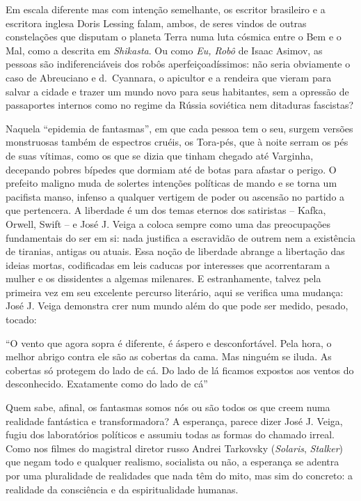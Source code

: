 \documentclass[
  letterpaper,
  DIV=11,
  numbers=noendperiod]{scrartcl}
\begin{document}
Em escala diferente mas com intenção semelhante, os escritor brasileiro
e a escritora inglesa Doris Lessing falam, ambos, de seres vindos de
outras constelações que disputam o planeta Terra numa luta cósmica entre
o Bem e o Mal, como a descrita em \emph{Shikasta}. Ou como \emph{Eu,
Robô} de Isaac Asimov, as pessoas são indiferenciáveis dos robôs
aperfeiçoadíssimos: não seria obviamente o caso de Abreuciano e
d.~Cyannara, o apicultor e a rendeira que vieram para salvar a cidade e
trazer um mundo novo para seus habitantes, sem a opressão de passaportes
internos como no regime da Rússia soviética nem ditaduras fascistas?

Naquela ``epidemia de fantasmas'', em que cada pessoa tem o seu, surgem
versões monstruosas também de espectros cruéis, os Tora-pés, que à noite
serram os pés de suas vítimas, como os que se dizia que tinham chegado
até Varginha, decepando pobres bípedes que dormiam até de botas para
afastar o perigo. O prefeito maligno muda de solertes intenções
políticas de mando e se torna um pacifista manso, infenso a qualquer
vertigem de poder ou ascensão no partido a que pertencera. A liberdade é
um dos temas eternos dos satiristas -- Kafka, Orwell, Swift -- e José J.
Veiga a coloca sempre como uma das preocupações fundamentais do ser em
si: nada justifica a escravidão de outrem nem a existência de tiranias,
antigas ou atuais. Essa noção de liberdade abrange a libertação das
ideias mortas, codificadas em leis caducas por interesses que
acorrentaram a mulher e os dissidentes a algemas milenares. E
estranhamente, talvez pela primeira vez em seu excelente percurso
literário, aqui se verifica uma mudança: José J. Veiga demonstra crer
num mundo além do que pode ser medido, pesado, tocado:

``O vento que agora sopra é diferente, é áspero e desconfortável. Pela
hora, o melhor abrigo contra ele são as cobertas da cama. Mas ninguém se
iluda. As cobertas só protegem do lado de cá. Do lado de lá ficamos
expostos aos ventos do desconhecido. Exatamente como do lado de cá''

Quem sabe, afinal, os fantasmas somos nós ou são todos os que creem numa
realidade fantástica e transformadora? A esperança, parece dizer José J.
Veiga, fugiu dos laboratórios políticos e assumiu todas as formas do
chamado irreal. Como nos filmes do magistral diretor russo Andrei
Tarkovsky (\emph{Solaris}, \emph{Stalker}) que negam todo e qualquer
realismo, socialista ou não, a esperança se adentra por uma pluralidade
de realidades que nada têm do mito, mas sim do concreto: a realidade da
consciência e da espiritualidade humanas.
\end{document}
